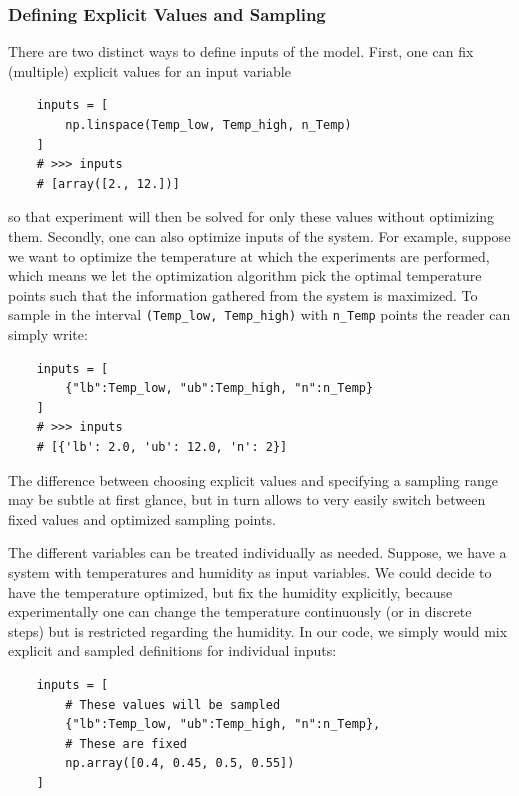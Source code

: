 \documentclass[graybox]{svmult}
\begin{document}
\subsubsection{Defining Explicit Values and Sampling}
There are two distinct ways to define inputs of the model.
First, one can fix (multiple) explicit values for an input variable
\begin{verbatim}
    inputs = [
        np.linspace(Temp_low, Temp_high, n_Temp)
    ]
    # >>> inputs
    # [array([2., 12.])]
\end{verbatim}
so that experiment will then be solved for only these values without optimizing them.
Secondly, one can also optimize inputs of the system.
For example, suppose we want to optimize the temperature at which the experiments are performed, which means we let the optimization algorithm pick the optimal temperature points such that the information gathered from the system is maximized.
To sample in the interval \texttt{(Temp_low, Temp_high)} with \texttt{n_Temp} points the reader can simply write:
\begin{verbatim}
    inputs = [
        {"lb":Temp_low, "ub":Temp_high, "n":n_Temp}
    ]
    # >>> inputs
    # [{'lb': 2.0, 'ub': 12.0, 'n': 2}]
\end{verbatim}
The difference between choosing explicit values and specifying a sampling range may be subtle at first glance, but in turn allows to very easily switch between fixed values and optimized sampling points.

The different variables can be treated individually as needed.
Suppose, we have a system with temperatures and humidity as input variables.
We could decide to have the temperature optimized, but fix the humidity explicitly, because experimentally one can change the temperature continuously (or in discrete steps) but is restricted regarding the humidity.
In our code, we simply would mix explicit and sampled definitions for individual inputs:
\begin{verbatim}
    inputs = [
        # These values will be sampled
        {"lb":Temp_low, "ub":Temp_high, "n":n_Temp},
        # These are fixed
        np.array([0.4, 0.45, 0.5, 0.55])
    ]
\end{verbatim}
%
\end{document}
